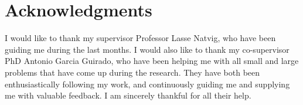 \section*{Acknowledgments}
I would like to thank my supervisor Professor Lasse Natvig, who have been guiding me during the last months.
I would also like to thank my co-supervisor PhD Antonio Garcia Guirado, who have been helping me with all small and large problems that have come up during the research.
They have both been enthusiastically following my work, and continuously guiding me and supplying me with valuable feedback.
I am sincerely thankful for all their help.
